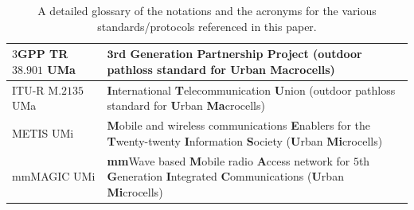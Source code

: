 \documentclass[12pt, draftcls, onecolumn]{IEEEtran}
\begin{document}
\begin{table} [tb]
\begin{tabular}{|l||l|}
        \hline
        \hline
        $3$GPP TR$38.901$ UMa & $\mathbf{3}$rd \textbf{G}eneration \textbf{P}artnership \textbf{P}roject (outdoor pathloss standard for \textbf{U}rban \textbf{Ma}crocells)\\
		\hline
		ITU-R M$.2135$ UMa & \textbf{I}nternational \textbf{T}elecommunication \textbf{U}nion (outdoor pathloss standard for \textbf{U}rban \textbf{Ma}crocells)\\
		\hline
        METIS UMi & \textbf{M}obile and wireless communications \textbf{E}nablers for the \textbf{T}wenty-twenty \textbf{I}nformation \textbf{S}ociety (\textbf{U}rban \textbf{Mi}crocells)\\
        \hline
        mmMAGIC UMi & \textbf{mm}Wave based \textbf{M}obile radio \textbf{A}ccess network for $5$th \textbf{G}eneration \textbf{I}ntegrated \textbf{C}ommunications (\textbf{U}rban \textbf{Mi}crocells)\\
        \hline
	\end{tabular}
	\vspace{-1mm}
	\caption{A detailed glossary of the notations and the acronyms for the various standards/protocols referenced in this paper.}
	\label{T1}
\end{table}
\end{document}
